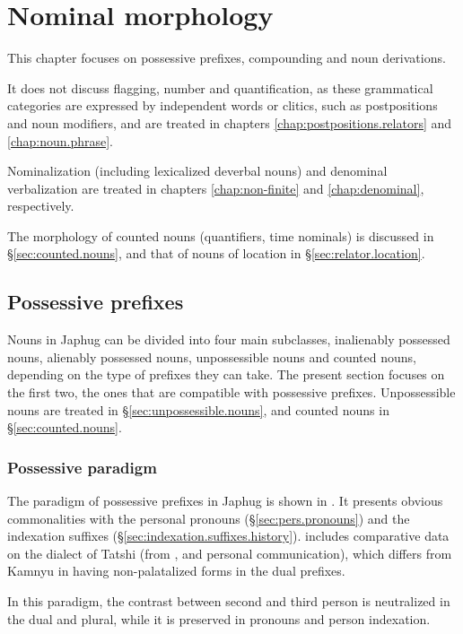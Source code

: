 \chapter{Nominal morphology} \label{chap:nominal.morphology}
This chapter focuses on possessive prefixes, compounding and  noun derivations. 

It does not discuss flagging, number and quantification, as these grammatical  categories are expressed by independent words or clitics, such as postpositions and noun modifiers, and are treated in chapters \ref{chap:postpositions.relators} and \ref{chap:noun.phrase}.

Nominalization (including lexicalized deverbal nouns) and denominal verbalization are treated in chapters \ref{chap:non-finite} and \ref{chap:denominal}, respectively. 

The morphology of counted nouns (quantifiers, time nominals) is discussed in §\ref{sec:counted.nouns}, and that of nouns of location in  §\ref{sec:relator.location}.

\section{Possessive prefixes}  \label{sec:possessive.prefixes}
Nouns in Japhug can be divided into four main subclasses, inalienably possessed nouns, alienably possessed nouns, unpossessible nouns and counted nouns, depending on the type of prefixes they can take.  The present section focuses on the first two, the ones that are compatible with possessive prefixes. Unpossessible nouns are treated in §\ref{sec:unpossessible.nouns}, and counted nouns in §\ref{sec:counted.nouns}.

\subsection{Possessive paradigm} \label{sec:possessive.paradigm}
The paradigm of possessive prefixes in Japhug is shown in . It presents obvious commonalities with the personal pronouns (§\ref{sec:pers.pronouns}) and the indexation suffixes (§\ref{sec:indexation.suffixes.history}).  includes comparative data on the dialect of Tatshi (from \citealt{linluo03}, \citealt{lin11direction} and personal communication), which differs from Kamnyu in having non-palatalized forms in the dual prefixes. 

In this paradigm, the contrast between second and third person is neutralized in the dual and plural, while it is preserved in pronouns and person indexation.


